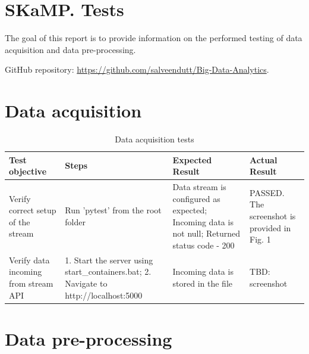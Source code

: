 \documentclass[12pt,a4paper, hidelinks]{article}
\begin{document}
\section*{SKaMP. Tests}
\vspace{\baselineskip} %

The goal of this report is to provide information on the performed testing of data acquisition and data pre-processing.

GitHub repository: \href{https://github.com/salveendutt/Big-Data-Analytics}{https://github.com/salveendutt/Big-Data-Analytics}.

\section{Data acquisition}

\begin{table}[htbp]
\centering
\begin{tabular}{|p{3cm}|p{4cm}|p{4cm}|p{5cm}|}
\hline
\textbf{Test objective} & \textbf{Steps} & \textbf{Expected Result} & \textbf{Actual Result} \\
\hline
Verify correct setup of the stream & Run 'pytest' from the root folder & Data stream is configured as expected; Incoming data is not null; Returned status code - 200 & PASSED. The screenshot is provided in Fig. 1 \\
\hline
Verify data incoming from stream API & 1. Start the server using start\_containers.bat; 2. Navigate to http://localhost:5000 & Incoming data is stored in the file & TBD: screenshot \\
\hline
\end{tabular}
\caption{Data acquisition tests}
\end{table}

\section{Data pre-processing}
\end{document}
